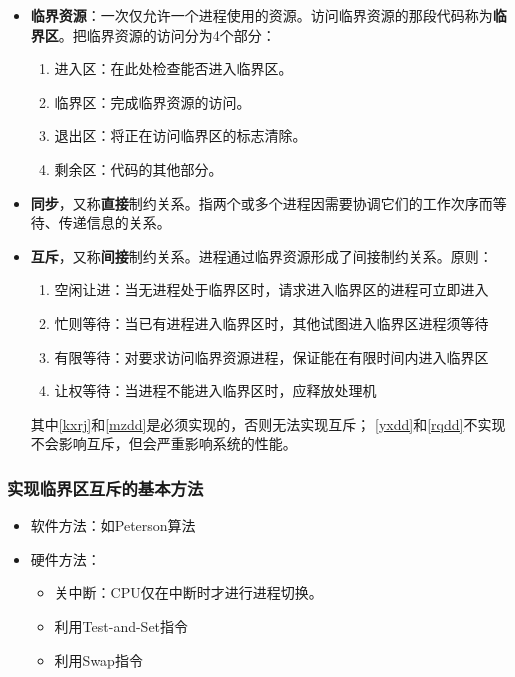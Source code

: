 \documentclass[12pt, a4paper, oneside]{ctexart}
\begin{document}
\begin{itemize}
  \item {\bf 临界资源}：一次仅允许一个进程使用的资源。访问临界资源的那段代码称为\textbf{临界区}。把临界资源的访问分为4个部分：
  \begin{enumerate}
    \item 进入区：在此处检查能否进入临界区。
    \item 临界区：完成临界资源的访问。
    \item 退出区：将正在访问临界区的标志清除。
    \item 剩余区：代码的其他部分。
  \end{enumerate}
  \item {\bf 同步}，又称\textbf{直接}制约关系。指两个或多个进程因需要协调它们的工作次序而等待、传递信息的关系。
  \item {\bf 互斥}，又称\textbf{间接}制约关系。进程通过临界资源形成了间接制约关系。原则：
  \begin{enumerate}
    \item \label{kxrj}空闲让进：当无进程处于临界区时，请求进入临界区的进程可立即进入
    \item \label{mzdd}忙则等待：当已有进程进入临界区时，其他试图进入临界区进程须等待
    \item \label{yxdd}有限等待：对要求访问临界资源进程，保证能在有限时间内进入临界区
    \item \label{rqdd}让权等待：当进程不能进入临界区时，应释放处理机
\end{enumerate}

其中\ref{kxrj}和\ref{mzdd}是必须实现的，否则无法实现互斥；
\ref{yxdd}和\ref{rqdd}不实现不会影响互斥，但会严重影响系统的性能。
\end{itemize}

\subsubsection{实现临界区互斥的基本方法}

\begin{itemize}
  \item 软件方法：如Peterson算法
  \item 硬件方法：
  \begin{itemize}
      \item 关中断：CPU仅在中断时才进行进程切换。
      \item 利用Test-and-Set指令
      \item 利用Swap指令
  \end{itemize}
\end{itemize}
\end{document}

